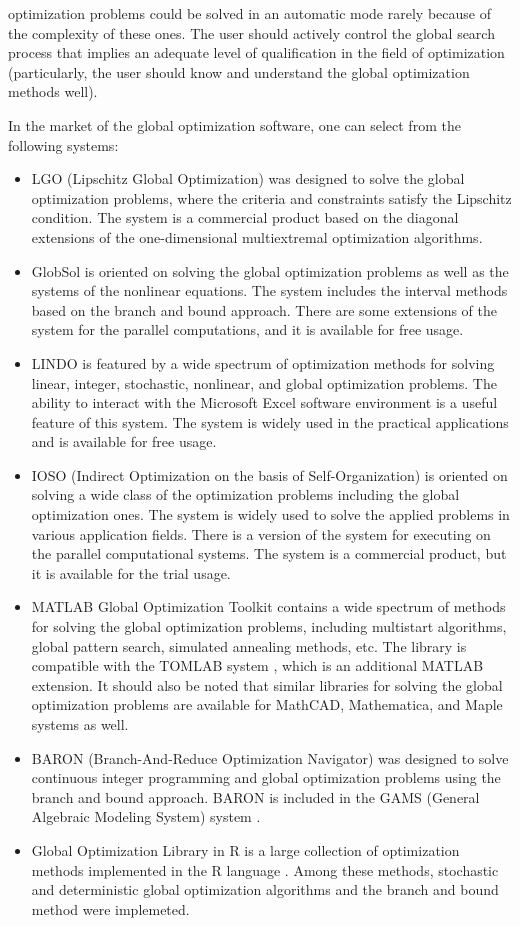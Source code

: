 \documentclass{naco}
\theoremstyle{definition}
\begin{document}
optimization problems could be solved in an automatic mode rarely because of the
complexity of these ones. The user should actively control the global search
process that implies an adequate level of qualification in the field of optimization
(particularly, the user should know and understand the global optimization methods well).
\par
In the market of the global optimization software, one can select from the following systems:
\begin{itemize}
\item LGO (Lipschitz Global Optimization) \cite{pinterGO} was designed to solve the global
optimization problems, where the criteria and constraints satisfy the Lipschitz condition.
The system is a commercial product based on the diagonal extensions of the one-dimensional multiextremal optimization algorithms.
\item GlobSol \cite{kearfott2009} is oriented on solving the global optimization
problems as well as the systems of the nonlinear equations. The system includes
the interval methods based on the branch and bound approach. There are some extensions
of the system for the parallel computations, and it is available for free usage.
\item LINDO \cite{linSchrage2009} is featured by a wide spectrum of optimization methods for solving linear, integer, stochastic, nonlinear, and global optimization problems. The ability to interact with the Microsoft Excel software environment is a useful feature of this system. The system is widely used in the practical applications and is available for free usage.
\item IOSO (Indirect Optimization on the basis of Self-Organization) \cite{iosoDescription} is oriented on solving a wide class of the optimization problems including the global optimization ones. The system is widely used to solve the applied problems in various application fields. There is a version of the system for executing on the parallel computational systems. The system is a commercial product, but it is available for the trial usage.
\item MATLAB Global Optimization Toolkit \cite{venkataraman2009} contains a wide
spectrum of methods for solving the global optimization problems, including multistart
algorithms, global pattern search, simulated annealing methods, etc. The library is
compatible with the TOMLAB system \cite{holmstromEdvall2004}, which is an additional
MATLAB extension. It should also be noted that similar libraries for solving the global
optimization problems are available for MathCAD, Mathematica, and Maple systems as well.
\item BARON (Branch-And-Reduce Optimization Navigator) \cite{sahinidis1996} was designed to
solve continuous integer programming and global optimization problems using the branch and
bound approach. BARON is included in the GAMS (General Algebraic Modeling System) system \cite{bussieckMeeraus2004}.
\item Global Optimization Library in R is a large collection of optimization methods
implemented in the R language \cite{mullen2014}. Among these methods, stochastic and
deterministic global optimization algorithms and the branch and bound method were implemeted.
\end{itemize}
\end{document}
